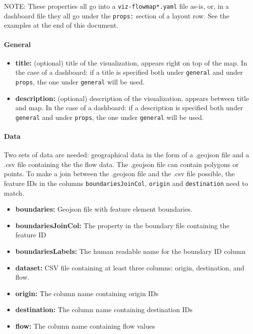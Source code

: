 NOTE: These properties all go into a \texttt{viz-flowmap*.yaml} file
as-is, or, in a dashboard file they all go under the \texttt{props:}
section of a layout row. See the examples at the end of this document.

\hypertarget{general}{%
\paragraph{General}\label{general}}

\begin{itemize}
\tightlist
\item
  \textbf{title:} (optional) title of the visualization, appears right
  on top of the map. In the case of a dashboard: if a title is specified
  both under \texttt{general} and under \texttt{props}, the one under
  \texttt{general} will be used.
\item
  \textbf{description:} (optional) description of the visualization,
  appears between title and map. In the case of a dashboard: if a
  description is specified both under \texttt{general} and under
  \texttt{props}, the one under \texttt{general} will be used.
\end{itemize}

\hypertarget{data}{%
\paragraph{Data}\label{data}}

Two sets of data are needed: geographical data in the form of a .geojson
file and a .csv file containing the the flow data. The .geojson file can
contain polygons or points. To make a join between the .geojson file and
the .csv file possible, the feature IDs in the columns
\texttt{boundariesJoinCol}, \texttt{origin} and \texttt{destination}
need to match.

\begin{itemize}
\tightlist
\item
  \textbf{boundaries:} Geojson file with feature element boundaries.
\item
  \textbf{boundariesJoinCol:} The property in the boundary file
  containing the feature ID
\item
  \textbf{boundariesLabels:} The human readable name for the boundary ID
  column
\item
  \textbf{dataset:} CSV file containing at least three columns: origin,
  destination, and flow.
\item
  \textbf{origin:} The column name containing origin IDs
\item
  \textbf{destination:} The column name containing destination IDs
\item
  \textbf{flow:} The column name containing flow values
\end{itemize}

